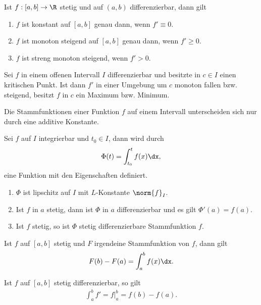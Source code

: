 \begin{prop}[Monotoniesatz]
Ist $f: [a,b]\to\R$ stetig und auf $(a,b)$ differenzierbar, dann gilt
\begin{enumerate}
  \item $f$ ist konstant auf $[a,b]$ genau dann, wenn $f' \equiv 0$.
  \item $f$ ist monoton steigend auf $[a,b]$ genau dann, wenn $f' \ge 0$.
  \item $f$ ist streng monoton steigend, wenn $f' > 0$.
\end{enumerate}
\end{prop}
\begin{prop}
Sei $f$ in einem offenen Intervall $I$ differenzierbar und besitzte in $c\in I$
einen kritischen Punkt. Ist dann $f'$ in einer Umgebung um $c$ monoton fallen
bzw. steigend, besitzt $f$ in $c$ ein Maximum bzw. Minimum. 
\end{prop}
\begin{prop}
Die Stammfunktionen einer Funktion $f$ auf einem Intervall unterscheiden sich
nur durch eine additive Konstante.
\end{prop}
\begin{prop}
Sei $f$ auf $I$ integrierbar und $t_0\in I$, dann wird durch
\begin{align*}
\Phi(t) = \int_{t_0}^t f(x)\dx,
\end{align*}
eine Funktion mit den Eigenschaften definiert.
\begin{enumerate}
  \item $\Phi$ ist lipschitz auf $I$ mit $L$-Konstante $\norm{f}_I$.
  \item Ist $f$ in $a$ stetig, dann ist $\Phi$ in $a$ differenzierbar und es
  gilt $\Phi'(a) = f(a)$.
  \item Ist $f$ stetig, so ist $\Phi$ stetig differenzierbare Stammfunktion
  $f$.
\end{enumerate}
\end{prop}
\begin{prop}
Ist $f$ auf $[a,b]$ stetig und $F$ irgendeine Stammfunktion von $f$, dann gilt
\begin{align*}
F(b) - F(a) = \int_a^b f(x)\dx.
\end{align*}
\end{prop}
\begin{prop}
Ist $f$ auf $[a,b]$ stetig differenzierbar, so gilt
\begin{align*}
\int_a^bf' = f\big|_a^b = f(b)-f(a).
\end{align*}
\end{prop}
